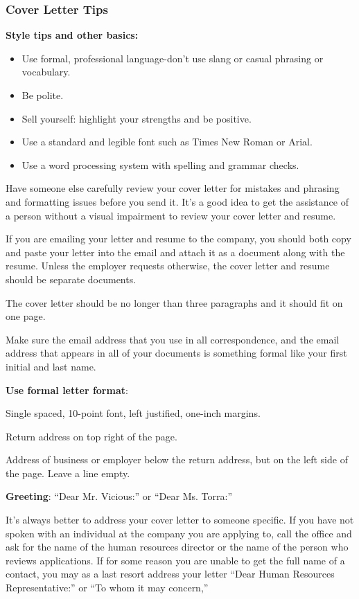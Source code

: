 \subsubsection*{Cover Letter Tips}
\textbf{Style tips and other basics:}
\begin{itemize}[leftmargin=*]
\item Use formal, professional language-don't use slang or casual phrasing or vocabulary.
\item Be polite.
\item Sell yourself: highlight your strengths and be positive.
\item Use a standard and legible font such as Times New Roman or Arial.
\item Use a word processing system with spelling and grammar checks.
\end{itemize}
Have someone else carefully review your cover letter for mistakes and phrasing and formatting issues before you send it. It's a good idea to get the assistance of a person without a visual impairment to review your cover letter and resume.

If you are emailing your letter and resume to the company, you should both copy and paste your letter into the email and attach it as a document along with the resume. Unless the employer requests otherwise, the cover letter and resume should be separate documents.

The cover letter should be no longer than three paragraphs and it should fit on one page.

Make sure the email address that you use in all correspondence, and the email address that appears in all of your documents is something formal like your first initial and last name.

\textbf{Use formal letter format}:

Single spaced, 10-point font, left justified, one-inch margins. 

Return address on top right of the page.

Address of business or employer below the return address, but on the left side of the page. Leave a line empty.

\textbf{Greeting}: ``Dear Mr. Vicious:'' or ``Dear Ms. Torra:''

It's always better to address your cover letter to someone specific. If you have not spoken with an individual at the company you are applying to, call the office and ask for the name of the human resources director or the name of the person who reviews applications. If for some reason you are unable to get the full name of a contact, you may as a last resort address your letter ``Dear Human Resources Representative:'' or ``To whom it may concern,''


